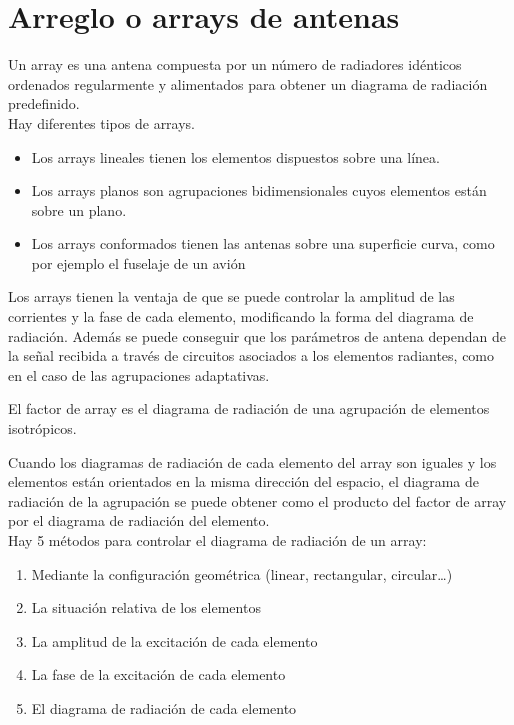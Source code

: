 \documentclass[
	12pt, %
	fleqn, %
	a4paper, %
	oneside, %
]{LegrandOrangeBook}
\begin{document}
\section{Arreglo o arrays de antenas}
Un array es una antena compuesta por un número de radiadores idénticos ordenados regularmente y alimentados para obtener un diagrama de radiación predefinido.\\
Hay diferentes tipos de arrays. 
\begin{itemize}
\item Los arrays lineales tienen los elementos dispuestos sobre una línea.
\item Los arrays planos son agrupaciones bidimensionales cuyos elementos están sobre un plano.
\item Los arrays conformados tienen las antenas sobre una superficie
curva, como por ejemplo el fuselaje de un avión
\end{itemize}
Los arrays tienen la ventaja de que se puede controlar la amplitud de las corrientes y la fase de cada elemento, modificando la forma del diagrama de radiación. Además se puede conseguir que los parámetros de antena dependan de la señal recibida a través de circuitos asociados a los elementos radiantes, como en el caso de las agrupaciones adaptativas.\\
\begin{notation}
El factor de array es el diagrama de radiación de una agrupación de
elementos isotrópicos.
\end{notation}
Cuando los diagramas de radiación de cada elemento del array son iguales y los elementos están orientados en la misma dirección del espacio, el diagrama de radiación de la agrupación se puede obtener como el producto del factor de array por el diagrama de radiación del elemento.\\
Hay 5 métodos para controlar el diagrama de radiación de un array:
\begin{enumerate}
\item Mediante la configuración geométrica (linear, rectangular, circular…)
\item La situación relativa de los elementos
\item La amplitud de la excitación de cada elemento
\item La fase de la excitación de cada elemento
\item El diagrama de radiación de cada elemento
\end{enumerate}
\end{document}
